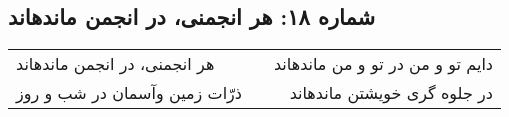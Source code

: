 \begin{center}
\section*{شماره ۱۸: هر انجمنی، در انجمن ماندهاند}
\label{sec:018}
\begin{longtable}{l p{0.5cm} r}
هر انجمنی، در انجمن ماندهاند
&&
دایم تو و من در تو و من ماندهاند
\\
ذرّات زمین وآسمان در شب و روز
&&
در جلوه گری خویشتن ماندهاند
\\
\end{longtable}
\end{center}
